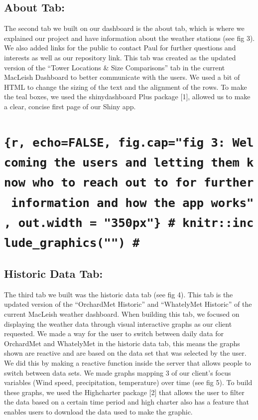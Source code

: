 \documentclass[10pt,letterpaper]{article}
\begin{document}
\subsection{About Tab:}\label{about-tab}

The second tab we built on our dashboard is the about tab, which is
where we explained our project and have information about the weather
stations (see fig 3). We also added links for the public to contact Paul
for further questions and interests as well as our repository link. This
tab was created as the updated version of the ``Tower Locations \& Size
Comparisons'' tab in the current MacLeish Dashboard to better
communicate with the users. We used a bit of HTML to change the sizing
of the text and the alignment of the rows. To make the teal boxes, we
used the shinydashboard Plus package {[}1{]}, allowed us to make a
clear, concise first page of our Shiny app.

\section{\texorpdfstring{\texttt{\{r,\ echo=FALSE,\ fig.cap="fig\ 3:\ Welcoming\ the\ users\ and\ letting\ them\ know\ who\ to\ reach\ out\ to\ for\ further\ information\ and\ how\ the\ app\ works",\ out.width\ =\ "350px"\}\ \#\ knitr::include\_graphics("")\ \#}}{\{r, echo=FALSE, fig.cap="fig 3: Welcoming the users and letting them know who to reach out to for further information and how the app works", out.width = "350px"\} \# knitr::include\_graphics("") \#}}\label{r-echofalse-fig.capfig-3-welcoming-the-users-and-letting-them-know-who-to-reach-out-to-for-further-information-and-how-the-app-works-out.width-350px-knitrinclude_graphics}

\subsection{Historic Data Tab:}\label{historic-data-tab}

The third tab we built was the historic data tab (see fig 4). This tab
is the updated version of the ``OrchardMet Historic'' and ``WhatelyMet
Historic'' of the current MacLeish weather dashboard. When building this
tab, we focused on displaying the weather data through visual
interactive graphs as our client requested. We made a way for the user
to switch between daily data for OrchardMet and WhatelyMet in the
historic data tab, this means the graphs shown are reactive and are
based on the data set that was selected by the user. We did this by
making a reactive function inside the server that allows people to
switch between data sets. We made graphs mapping 3 of our client's focus
variables (Wind speed, precipitation, temperature) over time (see fig
5). To build these graphs, we used the Highcharter package {[}2{]} that
allows the user to filter the data based on a certain time period and
high charter also has a feature that enables users to download the data
used to make the graphic.
\end{document}
